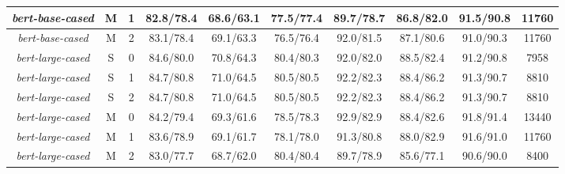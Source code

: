 \begin{table*}
{\begin{tabular}{|c|c|c||c|c|c|c|c|c||c|}
\textit{bert-base-cased} & M & 1 & 82.8/78.4 & 68.6/63.1 & 77.5/77.4 & 89.7/78.7 & 86.8/82.0 & 91.5/90.8 & 11760 \\ \hline
\textit{bert-base-cased} & M & 2 & 83.1/78.4 & 69.1/63.3 & 76.5/76.4 & 92.0/81.5 & 87.1/80.6 & 91.0/90.3 & 11760 \\ \hline
\textit{bert-large-cased} & S & 0 & 84.6/80.0 & 70.8/64.3 & 80.4/80.3 & 92.0/82.0 & 88.5/82.4 & 91.2/90.8 & 7958 \\ \hline
\textit{bert-large-cased} & S & 1 & 84.7/80.8 & 71.0/64.5 & 80.5/80.5 & 92.2/82.3 & 88.4/86.2 & 91.3/90.7 & 8810 \\ \hline
\textit{bert-large-cased} & S & 2 & 84.7/80.8 & 71.0/64.5 & 80.5/80.5 & 92.2/82.3 & 88.4/86.2 & 91.3/90.7 & 8810 \\ \hline
\textit{bert-large-cased} & M & 0 & 84.2/79.4 & 69.3/61.6 & 78.5/78.3 & 92.9/82.9 & 88.4/82.6 & 91.8/91.4 & 13440 \\ \hline
\textit{bert-large-cased} & M & 1 & 83.6/78.9 & 69.1/61.7 & 78.1/78.0 & 91.3/80.8 & 88.0/82.9 & 91.6/91.0 & 11760 \\ \hline
\textit{bert-large-cased} & M & 2 & 83.0/77.7 & 68.7/62.0 & 80.4/80.4 & 89.7/78.9 & 85.6/77.1 & 90.6/90.0 & 8400 \\ \hline
\end{tabular}}
\end{table*}


